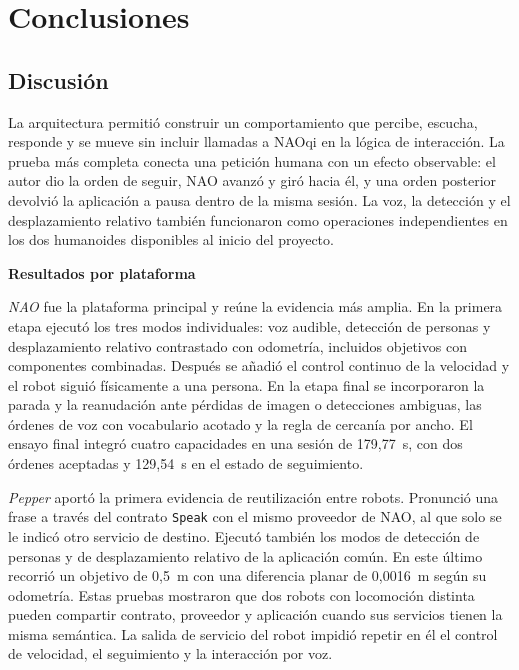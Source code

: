 \documentclass[11pt,letterpaper]{article}
\newcommand{\code}[1]{\nolinkurl{#1}}
\begin{document}
\FloatBarrier
\clearpage
\section{Conclusiones}
\subsection{Discusión}
La arquitectura permitió construir un comportamiento que percibe, escucha, responde y se mueve sin incluir llamadas a NAOqi en la lógica de interacción. La prueba más completa conecta una petición humana con un efecto observable: el autor dio la orden de seguir, NAO avanzó y giró hacia él, y una orden posterior devolvió la aplicación a pausa dentro de la misma sesión. La voz, la detección y el desplazamiento relativo también funcionaron como operaciones independientes en los dos humanoides disponibles al inicio del proyecto.

\par\medskip\noindent\textbf{Resultados por plataforma}\par

\emph{NAO} fue la plataforma principal y reúne la evidencia más amplia. En la primera etapa ejecutó los tres modos individuales: voz audible, detección de personas y desplazamiento relativo contrastado con odometría, incluidos objetivos con componentes combinadas. Después se añadió el control continuo de la velocidad y el robot siguió físicamente a una persona. En la etapa final se incorporaron la parada y la reanudación ante pérdidas de imagen o detecciones ambiguas, las órdenes de voz con vocabulario acotado y la regla de cercanía por ancho. El ensayo final integró cuatro capacidades en una sesión de 179,77~s, con dos órdenes aceptadas y 129,54~s en el estado de seguimiento.

\emph{Pepper} aportó la primera evidencia de reutilización entre robots. Pronunció una frase a través del contrato \code{Speak} con el mismo proveedor de NAO, al que solo se le indicó otro servicio de destino. Ejecutó también los modos de detección de personas y de desplazamiento relativo de la aplicación común. En este último recorrió un objetivo de 0,5~m con una diferencia planar de 0,0016~m según su odometría. Estas pruebas mostraron que dos robots con locomoción distinta pueden compartir contrato, proveedor y aplicación cuando sus servicios tienen la misma semántica. La salida de servicio del robot impidió repetir en él el control de velocidad, el seguimiento y la interacción por voz.
\end{document}
